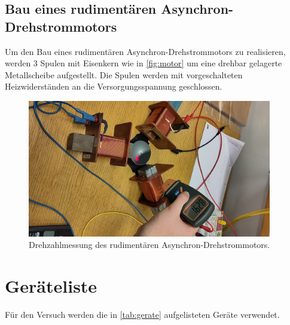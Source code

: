 \documentclass[12pt,english,ngerman]{scrartcl}
\begin{document}
\newpage
\subsection{Bau eines rudimentären Asynchron-Drehstrommotors}

Um den Bau eines rudimentären Asynchron-Drehstrommotors zu realisieren, werden
3 Spulen mit Eisenkern wie in \autoref{fig:motor} um eine drehbar gelagerte
Metallscheibe aufgestellt. Die Spulen werden mit vorgeschalteten
Heizwiderständen an die Versorgungsspannung geschlossen.

\begin{figure}[H]
	\begin{center}
		\includegraphics[width = 0.95\textwidth]{figures/motor.jpg}
	\end{center}
	\caption[Drehzahlmessung des rudimentären Asynchron-Drehstrommotors]{ Drehzahlmessung
		des rudimentären Asynchron-Drehstrommotors.
	}\label{fig:motor}
\end{figure}

\newpage
\section{Geräteliste}\label{sec:geraeteliste}

Für den Versuch werden die in \autoref{tab:gerate} aufgelisteten Geräte
verwendet.
\end{document}
